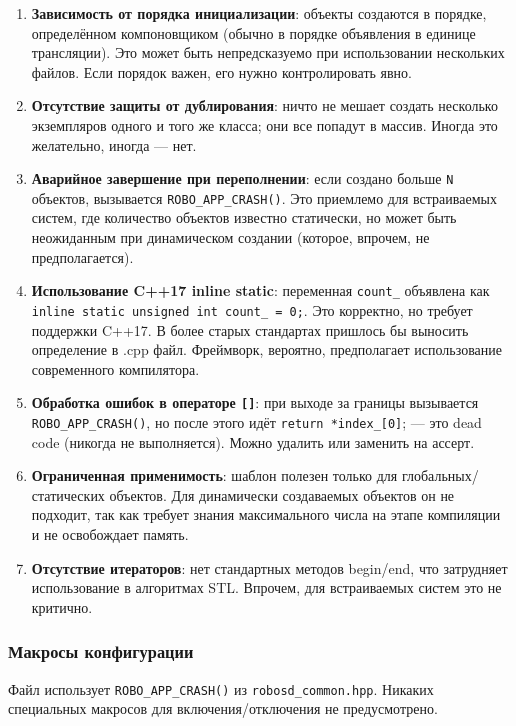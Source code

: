 \documentclass[a4paper,12pt]{article}
\begin{document}
\begin{enumerate}
    \item \textbf{Зависимость от порядка инициализации}: объекты создаются в порядке, определённом компоновщиком (обычно в порядке объявления в единице трансляции). Это может быть непредсказуемо при использовании нескольких файлов. Если порядок важен, его нужно контролировать явно.
    \item \textbf{Отсутствие защиты от дублирования}: ничто не мешает создать несколько экземпляров одного и того же класса; они все попадут в массив. Иногда это желательно, иногда — нет.
    \item \textbf{Аварийное завершение при переполнении}: если создано больше \texttt{N} объектов, вызывается \texttt{ROBO\_APP\_CRASH()}. Это приемлемо для встраиваемых систем, где количество объектов известно статически, но может быть неожиданным при динамическом создании (которое, впрочем, не предполагается).
    \item \textbf{Использование C++17 inline static}: переменная \texttt{count\_} объявлена как \texttt{inline static unsigned int count\_ = 0;}. Это корректно, но требует поддержки C++17. В более старых стандартах пришлось бы выносить определение в .cpp файл. Фреймворк, вероятно, предполагает использование современного компилятора.
    \item \textbf{Обработка ошибок в операторе \texttt{[]}}: при выходе за границы вызывается \texttt{ROBO\_APP\_CRASH()}, но после этого идёт \texttt{return *index\_[0]}; — это dead code (никогда не выполняется). Можно удалить или заменить на ассерт.
    \item \textbf{Ограниченная применимость}: шаблон полезен только для глобальных/статических объектов. Для динамически создаваемых объектов он не подходит, так как требует знания максимального числа на этапе компиляции и не освобождает память.
    \item \textbf{Отсутствие итераторов}: нет стандартных методов begin/end, что затрудняет использование в алгоритмах STL. Впрочем, для встраиваемых систем это не критично.
\end{enumerate}

\subsubsection{Макросы конфигурации}

Файл использует \texttt{ROBO\_APP\_CRASH()} из \texttt{robosd\_common.hpp}. Никаких специальных макросов для включения/отключения не предусмотрено.
\end{document}
